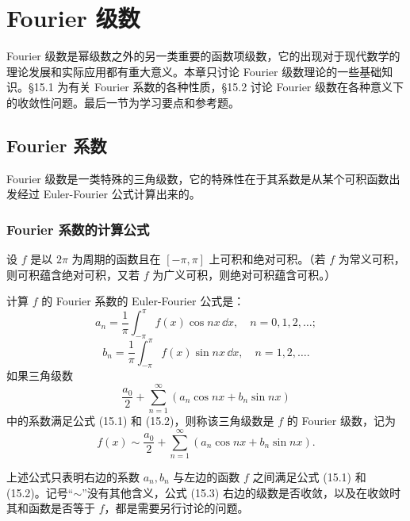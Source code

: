 \chapter{Fourier 级数}

Fourier 级数是幂级数之外的另一类重要的函数项级数，它的出现对于现代数学的理论发展和实际应用都有重大意义。本章只讨论 Fourier 级数理论的一些基础知识。§15.1 为有关 Fourier 系数的各种性质，§15.2 讨论 Fourier 级数在各种意义下的收敛性问题。最后一节为学习要点和参考题。

\section{Fourier 系数}

Fourier 级数是一类特殊的三角级数，它的特殊性在于其系数是从某个可积函数出发经过 Euler-Fourier 公式计算出来的。

\subsection{Fourier 系数的计算公式}

设 $f$ 是以 $2\pi$ 为周期的函数且在 $[-\pi,\pi]$ 上可积和绝对可积。（若 $f$ 为常义可积，则可积蕴含绝对可积，又若 $f$ 为广义可积，则绝对可积蕴含可积。）

计算 $f$ 的 Fourier 系数的 Euler-Fourier 公式是：
\begin{equation}
  a_n=\frac1\pi\int_{-\pi}^{\pi}f(x)\cos nx\,\dd x,\quad n=0,1,2,\ldots;
  \tag{15.1}
  \label{eq:15.1}
\end{equation}
\begin{equation}
  b_n=\frac1\pi\int_{-\pi}^{\pi}f(x)\sin nx\,\dd x,\quad n=1,2,\ldots.
  \tag{15.2}
  \label{eq:15.2}
\end{equation}
如果三角级数
\[
  \frac{a_0}{2}+\sum_{n=1}^{\infty}(a_n\cos nx+b_n\sin nx)
\]
中的系数满足公式 (15.1) 和 (15.2)，则称该三角级数是 $f$ 的 Fourier 级数，记为
\begin{equation}
  f(x)\sim\frac{a_0}{2}+\sum_{n=1}^{\infty}(a_n\cos nx+b_n\sin nx).
  \tag{15.3}
  \label{eq:15.3}
\end{equation}

\begin{xremark}
上述公式只表明右边的系数 $a_n,b_n$ 与左边的函数 $f$ 之间满足公式 (15.1) 和 (15.2)。记号“$\sim$”没有其他含义，公式 (15.3) 右边的级数是否收敛，以及在收敛时其和函数是否等于 $f$，都是需要另行讨论的问题。
\end{xremark}

